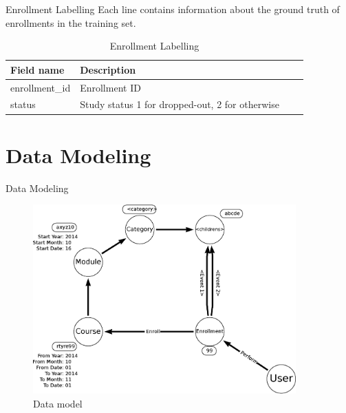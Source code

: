 \documentclass[10pt]{beamer}
\begin{document}
    \begin{frame}{Enrollment Labelling}
        Each line contains information about the ground truth of enrollments 
        in the training set. 

        \begin{table}
            \caption{\label{tab:course-dropped-out-indicator}Enrollment Labelling}
            \begin{tabular}{l*{2}{l}r}
                Field name      & Description \\
                \hline
                enrollment\_id  & Enrollment ID \\
                status          & Study status 1 for dropped-out, 2 for otherwise  \\
            \end{tabular}
        \end{table}
    \end{frame}

    \section[Data Modeling]{Data Modeling}
    \begin{frame}[fragile]{Data Modeling}
        \begin{figure}
            \includegraphics[width=0.9\textwidth]{asset/action-structure.eps}
            \caption{\label{fig:model-structure}Data model}
        \end{figure}
    \end{frame}
\end{document}
